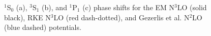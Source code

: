 \documentclass[preprintnumbers,floatfix,aps,prc,preprint,nofootinbib]{revtex4-1}
\begin{document}
\begin{figure}[H]
	\centering
	\quad
	\quad
	\caption{$^1$S$_0$ (a), $^3$S$_1$ (b), and $^1$P$_1$ (c) phase shifts for the EM N$^3$LO (solid black), RKE N$^3$LO (red dash-dotted), and Gezerlis et al. N$^2$LO (blue dashed) potentials.}
	\label{phase_shifts}
\end{figure}
%
\end{document}
